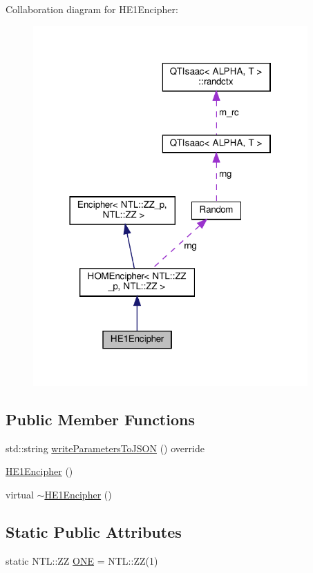 Collaboration diagram for H\+E1\+Encipher\+:\nopagebreak
\begin{figure}[H]
\begin{center}
\leavevmode
\includegraphics[width=298pt]{classHE1Encipher__coll__graph}
\end{center}
\end{figure}
\subsection*{Public Member Functions}
\begin{DoxyCompactItemize}
\item 
std\+::string \hyperlink{classHE1Encipher_a0aa1ef94d9147591367dbbc6ce03e5e1}{write\+Parameters\+To\+J\+S\+ON} () override
\item 
\hyperlink{classHE1Encipher_ad9128098166937e3569c4414aa1af689}{H\+E1\+Encipher} ()
\item 
virtual \hyperlink{classHE1Encipher_a5ffc18928bd189107151cb5a16c8cc5c}{$\sim$\+H\+E1\+Encipher} ()
\end{DoxyCompactItemize}
\subsection*{Static Public Attributes}
\begin{DoxyCompactItemize}
\item 
static N\+T\+L\+::\+ZZ \hyperlink{classHE1Encipher_a9c4f95a1461ec32d6e96db7c67aabdf3}{O\+NE} = N\+T\+L\+::\+ZZ(1)
\end{DoxyCompactItemize}
